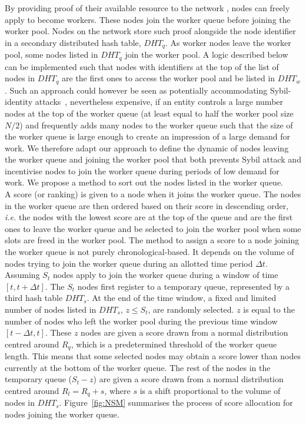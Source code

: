 By providing proof of their available resource to the network \cite{coremark,pos}, nodes can freely apply to become workers. These nodes join the worker queue before joining the worker pool. Nodes on the network store such proof alongside the node identifier in a secondary distributed hash table, $DHT_q$. As worker nodes leave the worker pool, some nodes listed in $DHT_q$ join the worker pool. A logic described below can be implemented such that nodes with identifiers at the top of the list of nodes in $DHT_q$ are the first ones to access the worker pool and be listed in $DHT_w$. Such an approach could however be seen as potentially accommodating Sybil-identity attacks~\cite{sybil}, nevertheless expensive, if an entity controls a large number nodes at the top of the worker queue (at least equal to half the worker pool size $N/2$) and frequently adds many nodes to the worker queue such that the size of the worker queue is large enough to create an impression of a large demand for work. %
We therefore adapt our approach to define the dynamic of nodes leaving the worker queue and joining the worker pool that both prevents Sybil attack and incentivise nodes to join the worker queue during periods of low demand for work. We propose a method to sort out the nodes listed in the worker queue.\\

A score (or ranking) is given to a node when it joins the worker queue. The nodes in the worker queue are then ordered based on their score in descending order, \textit{i.e.} the nodes with the lowest score are at the top of the queue and are the first ones to leave the worker queue and be selected to join the worker pool when some slots are freed in the worker pool. The method to assign a score to a node joining the worker queue is not purely chronological-based. It depends on the volume of nodes trying to join the worker queue during an allotted time period $\Delta t$. Assuming $S_t$ nodes apply to join the worker queue during a window of time $[t, t+\Delta t]$. The $S_t$ nodes first register to a temporary queue, represented by a third hash table $DHT_s$. At the end of the time window, a fixed and limited number of nodes listed in $DHT_s$, $z \leq S_t$, are randomly selected. $z$ is equal to the number of nodes who left the worker pool during the previous time window $[t-\Delta t, t]$. These $z$ nodes are given a score drawn from a normal distribution centred around $R_q$, which is a predetermined threshold of the worker queue length. This means that some selected nodes may obtain a score lower than nodes currently at the bottom of the worker queue. The rest of the nodes in the temporary queue ($S_t-z$) are given a score drawn from a normal distribution centred around $R_l = R_q + s$, where $s$ is a shift proportional to the volume of nodes in $DHT_s$. Figure~\ref{fig:NSM} summarises the process of score allocation for nodes joining the worker queue. \\

